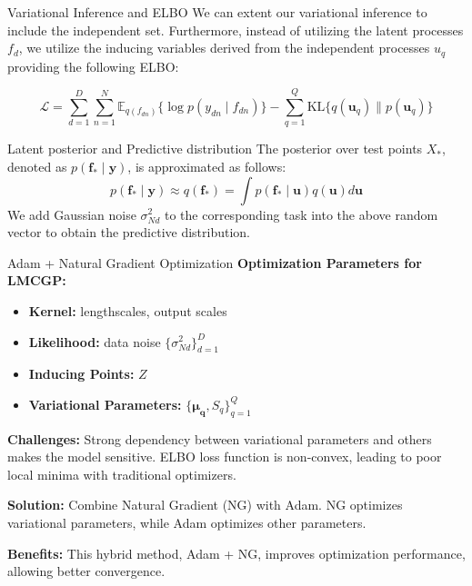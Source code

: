 \begin{frame}{Variational Inference and ELBO}
	We can extent our variational inference to include the independent set. Furthermore, instead of utilizing the latent processes $f_d$, we utilize the inducing variables derived from the independent processes $u_q$ providing the following ELBO:
	
	\begin{equation}\label{eq:lmc_elbo}
		\mathcal{L} = \sum_{d=1}^D\sum_{n=1}^{N} \mathbb{E}_{q(f_{dn})}\{\log p(y_{dn} \mid f_{dn})\} - \sum_{q=1}^Q \text{KL}\{q(\mathbf{u}_q)\parallel p(\mathbf{u}_q)\}
	\end{equation}
	
\end{frame}

\begin{frame}{Latent posterior and Predictive distribution}
	The posterior over test points $X_*$, denoted as $p(\mathbf{f}_* \mid \mathbf{y})$, is approximated as follows:
	\begin{equation}
		p(\mathbf{f}_* \mid \mathbf{y}) \approx q(\mathbf{f}_*) = \int p(\mathbf{f}_* \mid \mathbf{u}) q(\mathbf{u}) d \mathbf{u}
	\end{equation}
	We add Gaussian noise $\sigma_{Nd}^2$ to the corresponding task into the above random vector to obtain the predictive distribution.
\end{frame}

\begin{frame}{Adam + Natural Gradient Optimization} \textbf{Optimization Parameters for LMCGP:} \begin{itemize} \item \textbf{Kernel:} lengthscales, output scales \item \textbf{Likelihood:} data noise $\{ \sigma^2_{Nd} \}_{d=1}^D$ \item \textbf{Inducing Points:} $Z$ \item \textbf{Variational Parameters:} $\{\mathbf{\mu_q}, S_q\}_{q=1}^Q$ \end{itemize}
	
	\textbf{Challenges:} Strong dependency between variational parameters and others makes the model sensitive. ELBO loss function is non-convex, leading to poor local minima with traditional optimizers.
	
	\textbf{Solution:} Combine Natural Gradient (NG) with Adam. NG optimizes variational parameters, while Adam optimizes other parameters.
	
	\textbf{Benefits:} This hybrid method, Adam + NG, improves optimization performance, allowing better convergence.
\end{frame}


